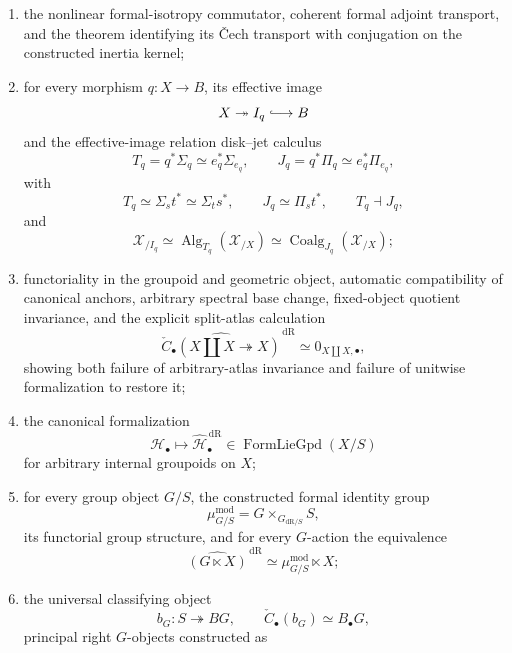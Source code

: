 \begin{theorem}
\begin{enumerate}
    $M^{\mathrm{for}}_{\mathfrak G}$, with
    \[
        t^*I^{\mathrm{for}}_{\mathfrak G}
        \simeq
        \mathfrak G_1\times_{R_{X/S}}\mathfrak G_1
        \simeq
        s^*I^{\mathrm{for}}_{\mathfrak G};
    \]
    \item the nonlinear formal-isotropy commutator, coherent formal adjoint
    transport, and the theorem identifying its \v{C}ech transport with
    conjugation on the constructed inertia kernel;
    \item for every morphism $q:X\to B$, its effective image
    \[
        X\twoheadrightarrow I_q\lhook\joinrel\longrightarrow B
    \]
    and the effective-image relation disk--jet calculus
    \[
        T_q=q^*\Sigma_q\simeq e_q^*\Sigma_{e_q},
        \qquad
        J_q=q^*\Pi_q\simeq e_q^*\Pi_{e_q},
    \]
    with
    \[
        T_q\simeq\Sigma_s t^*\simeq\Sigma_t s^*,
        \qquad
        J_q\simeq\Pi_s t^*,
        \qquad
        T_q\dashv J_q,
    \]
    and
    \[
        \mathcal X_{/I_q}
        \simeq
        \operatorname{Alg}_{T_q}(\mathcal X_{/X})
        \simeq
        \operatorname{Coalg}_{J_q}(\mathcal X_{/X});
    \]
    \item functoriality in the groupoid and geometric object, automatic
    compatibility of canonical anchors, arbitrary spectral base change,
    fixed-object quotient invariance, and the explicit split-atlas
    calculation
    \[
        \widehat{\check C_\bullet(X\amalg X\twoheadrightarrow X)}^{\,\mathrm{dR}}
        \simeq
        0_{X\amalg X,\bullet},
    \]
    showing both failure of arbitrary-atlas invariance and failure of
    unitwise formalization to restore it;
    \item the canonical formalization
    \[
        \mathcal H_\bullet
        \longmapsto
        \widehat{\mathcal H}^{\,\mathrm{dR}}_\bullet
        \in
        \operatorname{FormLieGpd}(X/S)
    \]
    for arbitrary internal groupoids on $X$;
    \item for every group object $G/S$, the constructed formal identity group
    \[
        \mu^{\mathrm{mod}}_{G/S}
        =
        G\times_{G_{\mathrm{dR}/S}}S,
    \]
    its functorial group structure, and for every $G$-action the equivalence
    \[
        \widehat{(G\ltimes X)}^{\,\mathrm{dR}}
        \simeq
        \mu^{\mathrm{mod}}_{G/S}\ltimes X;
    \]
    \item the universal classifying object
    \[
        b_G:S\twoheadrightarrow BG,
        \qquad
        \check C_\bullet(b_G)\simeq B_\bullet G,
    \]
    principal right $G$-objects constructed as

\end{enumerate}
\end{theorem}
